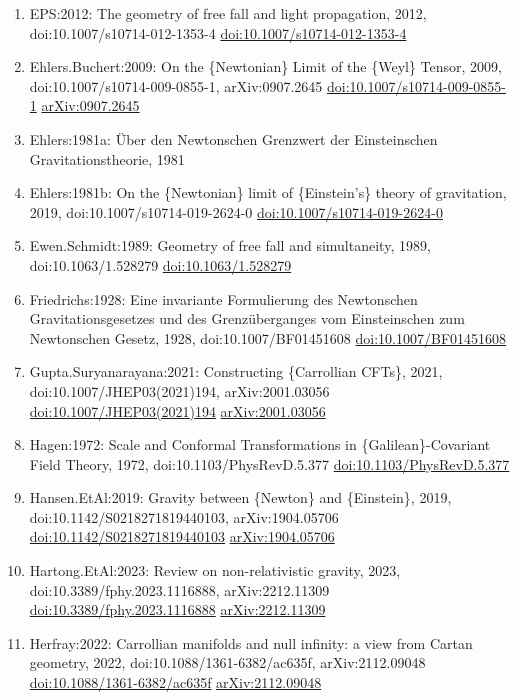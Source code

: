 \documentclass[11pt]{article}
\begin{document}
\begin{enumerate}[leftmargin=*]
  \item EPS:2012: The geometry of free fall and light propagation, 2012, doi:10.1007/s10714-012-1353-4 \href{https://doi.org/10.1007/s10714-012-1353-4}{doi:10.1007/s10714-012-1353-4}
  \item Ehlers.Buchert:2009: On the \{Newtonian\} Limit of the \{Weyl\} Tensor, 2009, doi:10.1007/s10714-009-0855-1, arXiv:0907.2645 \href{https://doi.org/10.1007/s10714-009-0855-1}{doi:10.1007/s10714-009-0855-1} \href{https://arxiv.org/abs/0907.2645}{arXiv:0907.2645}
  \item Ehlers:1981a: Über den Newtonschen Grenzwert der Einsteinschen Gravitationstheorie, 1981
  \item Ehlers:1981b: On the \{Newtonian\} limit of \{Einstein's\} theory of gravitation, 2019, doi:10.1007/s10714-019-2624-0 \href{https://doi.org/10.1007/s10714-019-2624-0}{doi:10.1007/s10714-019-2624-0}
  \item Ewen.Schmidt:1989: Geometry of free fall and simultaneity, 1989, doi:10.1063/1.528279 \href{https://doi.org/10.1063/1.528279}{doi:10.1063/1.528279}
  \item Friedrichs:1928: Eine invariante Formulierung des Newtonschen Gravitationsgesetzes und des Grenzüberganges vom Einsteinschen zum Newtonschen Gesetz, 1928, doi:10.1007/BF01451608 \href{https://doi.org/10.1007/BF01451608}{doi:10.1007/BF01451608}
  \item Gupta.Suryanarayana:2021: Constructing \{Carrollian CFTs\}, 2021, doi:10.1007/JHEP03(2021)194, arXiv:2001.03056 \href{https://doi.org/10.1007/JHEP03(2021)194}{doi:10.1007/JHEP03(2021)194} \href{https://arxiv.org/abs/2001.03056}{arXiv:2001.03056}
  \item Hagen:1972: Scale and Conformal Transformations in \{Galilean\}-Covariant Field Theory, 1972, doi:10.1103/PhysRevD.5.377 \href{https://doi.org/10.1103/PhysRevD.5.377}{doi:10.1103/PhysRevD.5.377}
  \item Hansen.EtAl:2019: Gravity between \{Newton\} and \{Einstein\}, 2019, doi:10.1142/S0218271819440103, arXiv:1904.05706 \href{https://doi.org/10.1142/S0218271819440103}{doi:10.1142/S0218271819440103} \href{https://arxiv.org/abs/1904.05706}{arXiv:1904.05706}
  \item Hartong.EtAl:2023: Review on non-relativistic gravity, 2023, doi:10.3389/fphy.2023.1116888, arXiv:2212.11309 \href{https://doi.org/10.3389/fphy.2023.1116888}{doi:10.3389/fphy.2023.1116888} \href{https://arxiv.org/abs/2212.11309}{arXiv:2212.11309}
  \item Herfray:2022: Carrollian manifolds and null infinity: a view from Cartan geometry, 2022, doi:10.1088/1361-6382/ac635f, arXiv:2112.09048 \href{https://doi.org/10.1088/1361-6382/ac635f}{doi:10.1088/1361-6382/ac635f} \href{https://arxiv.org/abs/2112.09048}{arXiv:2112.09048}

\end{enumerate}
\end{document}

